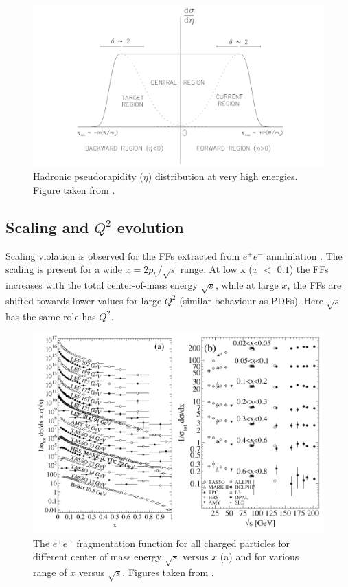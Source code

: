 \begin{figure}[!h]
  \centering
	\includegraphics[scale=0.5]{./gfx/Berger.png}
	\caption{Hadronic pseudorapidity ($\eta$) distribution at very high energies. Figure taken from \cite{Niczy}.}
	\label{pic:Berger}
\end{figure}

\subsection{Scaling and $Q^2$ evolution}

Scaling violation is observed for the FFs extracted from $e^+e^-$ annihilation \cite{PDG}. The scaling is present for a wide $x = 2p_h/\sqrt{s}$ range. At low x ($x$ $<$ $0.1$) the FFs increases with the total center-of-mass energy $\sqrt{s}$, while at large $x$, the FFs are shifted towards lower values for large $Q^2$ (similar behaviour as PDFs). Here $\sqrt{s}$ has the same role has $Q^2$.

\begin{figure}[!h]
  \centering
	\includegraphics[scale=0.6]{./gfx/FFscale.png}
	\caption{The $e^+ e^-$ fragmentation function for all charged particles for different center of mass energy $\sqrt{s}$ versus $x$ (a) and for various range of $x$ versus $\sqrt{s}$. Figures taken from \cite{PDG}.}
	\label{pic:FFscale}
\end{figure}

